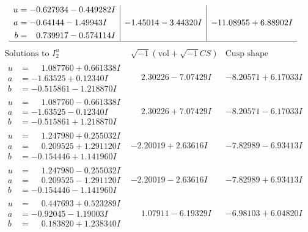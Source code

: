 \documentclass[1p]{elsarticle_modified}
\theoremstyle{definition}
\newcommand{\I}{\sqrt{-1}}
\begin{document}
$$\begin{array}{c|c|c}
\begin{aligned}
u &= -0.627934 - 0.449282 I \\
a &= -0.64144 - 1.49943 I \\
b &= \phantom{-}0.739917 - 0.574114 I\end{aligned}
 & -1.45014 - 3.44320 I & -11.08955 + 6.88902 I\\
 \hline 
 \end{array}$$\newpage$$\begin{array}{c|c|c}  
\text{Solutions to }I^u_{2}& \I (\text{vol} + \sqrt{-1}CS) & \text{Cusp shape}\\
 \hline 
\begin{aligned}
u &= \phantom{-}1.087760 + 0.661338 I \\
a &= -1.63525 + 0.12340 I \\
b &= -0.515861 - 1.218870 I\end{aligned}
 & \phantom{-}2.30226 - 7.07429 I & -8.20571 + 6.17033 I \\ \hline\begin{aligned}
u &= \phantom{-}1.087760 - 0.661338 I \\
a &= -1.63525 - 0.12340 I \\
b &= -0.515861 + 1.218870 I\end{aligned}
 & \phantom{-}2.30226 + 7.07429 I & -8.20571 - 6.17033 I \\ \hline\begin{aligned}
u &= \phantom{-}1.247980 + 0.255032 I \\
a &= \phantom{-}0.209525 + 1.291120 I \\
b &= -0.154446 + 1.141960 I\end{aligned}
 & -2.20019 + 2.63616 I & -7.82989 - 6.93413 I \\ \hline\begin{aligned}
u &= \phantom{-}1.247980 - 0.255032 I \\
a &= \phantom{-}0.209525 - 1.291120 I \\
b &= -0.154446 - 1.141960 I\end{aligned}
 & -2.20019 - 2.63616 I & -7.82989 + 6.93413 I \\ \hline\begin{aligned}
u &= \phantom{-}0.447693 + 0.523289 I \\
a &= -0.92045 - 1.19003 I \\
b &= \phantom{-}0.183820 + 1.238340 I\end{aligned}
 & \phantom{-}1.07911 - 6.19329 I & -6.98103 + 6.04820 I \\ \hline\begin{aligned}

\end{aligned}
\end{array}$$
\end{document}
